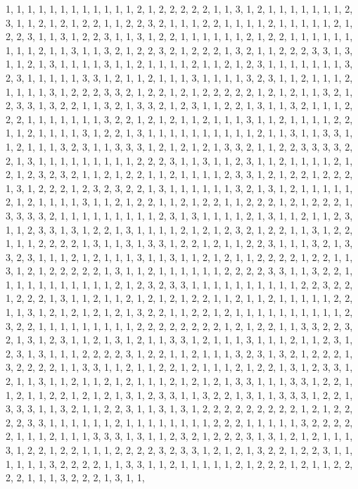 \documentclass[
]{article}
\begin{document}
\begin{Schunk}
\begin{Soutput}
1, 1, 1, 1, 1, 1, 1, 1, 1, 1, 1, 1, 2, 1, 2, 2, 2, 2, 2, 1, 1, 3, 1, 2, 1, 1, 1, 1, 1, 1, 1, 2, 3, 1, 1, 2, 1, 2, 1, 2, 2, 1, 1, 2, 2, 3, 2, 1, 1, 1, 2, 2, 1, 1, 1, 1, 2, 1, 1, 1, 1, 1, 2, 1, 2, 2, 3, 1, 1, 3, 1, 2, 2, 3, 1, 1, 3, 1, 2, 2, 1, 1, 1, 1, 1, 1, 2, 1, 2, 2, 1, 1, 1, 1, 1, 1, 1, 1, 1, 2, 1, 1, 3, 1, 1, 3, 2, 1, 2, 2, 3, 2, 1, 2, 2, 2, 1, 3, 2, 1, 1, 2, 2, 2, 3, 3, 1, 3, 1, 1, 2, 1, 3, 1, 1, 1, 1, 3, 1, 1, 2, 1, 1, 1, 1, 2, 1, 1, 2, 1, 2, 3, 1, 1, 1, 1, 1, 1, 1, 3, 2, 3, 1, 1, 1, 1, 1, 3, 3, 1, 2, 1, 1, 2, 1, 1, 1, 3, 1, 1, 1, 1, 3, 2, 3, 1, 1, 2, 1, 1, 1, 2, 1, 1, 1, 1, 3, 1, 2, 2, 2, 3, 3, 2, 1, 2, 2, 1, 2, 1, 2, 2, 2, 2, 2, 1, 2, 1, 2, 1, 1, 3, 2, 1, 2, 3, 3, 1, 3, 2, 2, 1, 1, 3, 2, 1, 3, 3, 2, 1, 2, 3, 1, 1, 2, 2, 1, 3, 1, 1, 3, 2, 1, 1, 1, 2, 2, 2, 1, 1, 1, 1, 1, 1, 1, 3, 2, 2, 1, 2, 1, 2, 1, 1, 2, 1, 1, 1, 3, 1, 1, 2, 1, 1, 1, 1, 2, 2, 1, 1, 2, 1, 1, 1, 1, 3, 1, 2, 2, 1, 3, 1, 1, 1, 1, 1, 1, 1, 1, 1, 1, 2, 1, 1, 3, 1, 1, 3, 3, 1, 1, 2, 1, 1, 1, 3, 2, 3, 1, 1, 3, 3, 3, 1, 2, 1, 2, 1, 2, 1, 3, 3, 2, 1, 1, 2, 2, 3, 3, 3, 3, 2, 2, 1, 3, 1, 1, 1, 1, 1, 1, 1, 1, 1, 2, 2, 2, 3, 1, 1, 3, 1, 1, 2, 3, 1, 1, 2, 1, 1, 1, 1, 2, 1, 2, 1, 2, 3, 2, 3, 2, 1, 1, 2, 1, 2, 2, 1, 1, 2, 1, 1, 1, 1, 2, 3, 3, 1, 2, 1, 2, 2, 1, 2, 2, 2, 1, 3, 1, 2, 2, 2, 1, 2, 3, 2, 3, 2, 2, 1, 3, 1, 1, 1, 1, 1, 1, 3, 2, 1, 3, 1, 2, 1, 1, 1, 1, 1, 2, 1, 2, 1, 1, 1, 1, 3, 1, 1, 2, 1, 2, 2, 1, 1, 2, 1, 2, 2, 1, 1, 2, 2, 2, 1, 2, 1, 2, 2, 2, 1, 3, 3, 3, 3, 2, 1, 1, 1, 1, 1, 1, 1, 1, 1, 2, 3, 1, 3, 1, 1, 1, 1, 2, 1, 3, 1, 1, 2, 1, 1, 2, 3, 1, 1, 2, 3, 3, 1, 3, 1, 2, 2, 1, 3, 1, 1, 1, 1, 2, 1, 2, 1, 2, 3, 2, 1, 2, 2, 1, 1, 3, 1, 2, 2, 1, 1, 1, 2, 2, 2, 2, 1, 3, 1, 1, 3, 1, 3, 3, 1, 2, 2, 1, 2, 1, 1, 2, 2, 3, 1, 1, 1, 3, 2, 1, 3, 3, 2, 3, 1, 1, 1, 2, 1, 2, 1, 1, 1, 3, 1, 1, 3, 1, 1, 2, 1, 2, 1, 1, 2, 2, 2, 2, 1, 2, 2, 1, 1, 3, 1, 2, 1, 2, 2, 2, 2, 2, 1, 3, 1, 1, 2, 1, 1, 1, 1, 1, 1, 2, 2, 2, 2, 3, 3, 1, 1, 3, 2, 2, 1, 1, 1, 1, 1, 1, 1, 1, 1, 1, 1, 2, 1, 2, 3, 2, 3, 3, 1, 1, 1, 1, 1, 1, 1, 1, 1, 1, 2, 2, 3, 2, 2, 1, 2, 2, 2, 1, 3, 1, 1, 2, 1, 1, 2, 1, 2, 1, 2, 1, 2, 2, 1, 1, 2, 1, 1, 2, 1, 1, 1, 1, 1, 2, 2, 1, 1, 3, 1, 2, 1, 2, 1, 2, 1, 2, 1, 3, 2, 2, 1, 1, 2, 2, 1, 2, 1, 1, 1, 1, 1, 1, 1, 1, 1, 1, 2, 3, 2, 2, 1, 1, 1, 1, 1, 1, 1, 1, 1, 2, 2, 2, 2, 2, 2, 2, 2, 1, 2, 1, 2, 2, 1, 1, 3, 3, 2, 2, 3, 2, 1, 3, 1, 2, 3, 1, 1, 2, 1, 3, 1, 2, 1, 1, 3, 3, 1, 2, 1, 1, 1, 3, 1, 1, 1, 2, 1, 1, 2, 3, 1, 2, 3, 1, 3, 1, 1, 1, 2, 2, 2, 2, 3, 1, 2, 2, 1, 1, 2, 1, 1, 1, 3, 2, 3, 1, 3, 2, 1, 2, 2, 2, 1, 3, 2, 2, 2, 2, 1, 1, 3, 3, 1, 1, 2, 1, 1, 2, 2, 1, 2, 1, 1, 1, 2, 1, 2, 2, 1, 3, 1, 2, 3, 3, 1, 2, 1, 1, 3, 1, 1, 2, 1, 1, 2, 1, 2, 1, 1, 1, 2, 1, 2, 1, 2, 1, 3, 3, 1, 1, 1, 3, 3, 1, 2, 2, 1, 1, 2, 1, 1, 2, 2, 1, 2, 1, 2, 1, 3, 1, 2, 3, 3, 1, 1, 3, 2, 2, 1, 3, 1, 1, 3, 3, 3, 1, 2, 2, 1, 3, 3, 3, 1, 1, 3, 2, 1, 1, 2, 2, 3, 1, 1, 3, 1, 3, 1, 2, 2, 2, 2, 2, 2, 2, 2, 2, 1, 2, 1, 2, 2, 2, 2, 3, 3, 1, 1, 1, 1, 1, 1, 2, 1, 1, 1, 1, 1, 1, 1, 1, 2, 2, 2, 1, 1, 1, 1, 1, 3, 2, 2, 2, 2, 2, 1, 1, 1, 2, 1, 1, 1, 3, 3, 3, 1, 3, 1, 1, 2, 3, 2, 1, 2, 2, 2, 3, 1, 3, 1, 2, 1, 2, 1, 1, 1, 3, 1, 2, 2, 1, 2, 2, 1, 1, 1, 2, 2, 2, 2, 3, 2, 3, 3, 1, 2, 1, 2, 1, 3, 2, 2, 1, 2, 2, 3, 1, 1, 1, 1, 1, 1, 3, 2, 2, 2, 2, 1, 1, 3, 3, 1, 1, 2, 1, 1, 1, 1, 1, 2, 1, 2, 2, 2, 1, 2, 1, 1, 2, 2, 2, 2, 1, 1, 1, 3, 2, 2, 2, 1, 3, 1, 1, 
\end{Soutput}
\end{Schunk}
\end{document}
